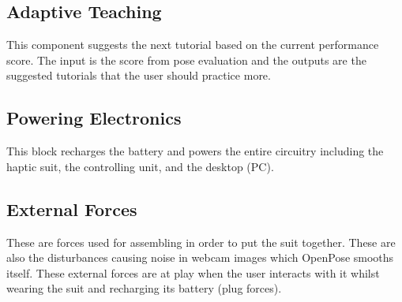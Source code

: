 \subsection{Adaptive Teaching}
This component suggests the next tutorial based on the current performance score. The input is the score from pose evaluation and the outputs are the suggested tutorials that the user should practice more. 
\subsection{Powering Electronics}
This block recharges the battery and powers the entire circuitry including the haptic suit, the controlling unit, and the desktop (PC). 
\subsection{External Forces}
These are forces used for assembling in order to put the suit together. These are also the disturbances causing noise in webcam images which OpenPose smooths itself. These external forces are at play when the user interacts with it whilst wearing the suit and recharging its battery (plug forces).




